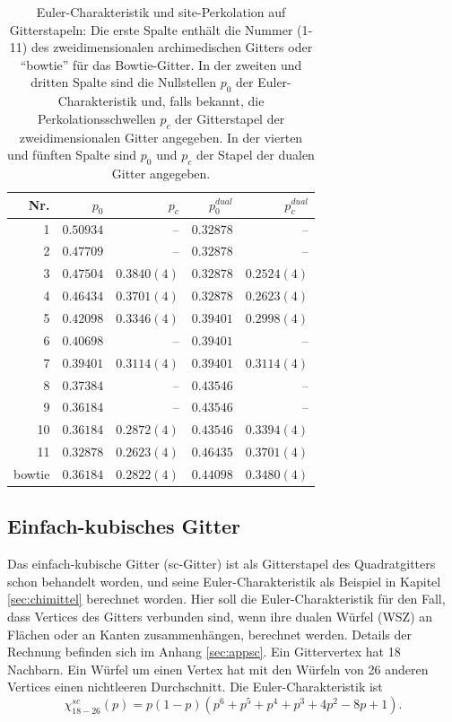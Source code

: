 \begin{table}
  \centering
  \begin{tabular} {|r|r|r||r|r|}
\hline
Nr. & $p_0$ & $p_c$\cite{Marck:97} & $p_0^{dual}$ &$ p_c^{dual}$\cite{Marck:97} \\ \hline
1 &$0.50934$&--&$0.32878$&--\\ \hline
2 &$0.47709$&--&$0.32878$&--\\ \hline
3 &$0.47504$&$0.3840(4)$&$0.32878$&$0.2524(4)$ \\ \hline
4 &$0.46434$&$0.3701(4)$&$0.32878$&$0.2623(4)$ \\ \hline
5 &$0.42098 $&$0.3346(4)$&$0.39401$&$0.2998(4)$ \\ \hline
6 &$0.40698$&--& $0.39401$&--\\ \hline
7 &$0.39401 $&$0.3114(4)$&$0.39401$&$0.3114(4)$ \\ \hline
8 &$0.37384$&--& $0.43546$&--\\ \hline
9 &$0.36184$&--&  $0.43546$&--\\ \hline
10 &$0.36184 $&$0.2872(4)$& $0.43546$&$0.3394(4)$ \\ \hline
11 &$0.32878 $&$0.2623(4)$&$0.46435$&$0.3701(4)$ \\ \hline
bowtie &$0.36184$&$ 0.2822(4)$ &$0.44098$ &$0.3480(4)$ \\ \hline
\end{tabular}
\caption{Euler-Charakteristik und site-Perkolation auf Gitterstapeln: Die erste Spalte enth\"alt die Nummer (1-11) des zweidimensionalen archimedischen Gitters oder ``bowtie'' f\"ur das Bowtie-Gitter. In der zweiten und dritten Spalte sind die Nullstellen $p_0$ der Euler-Charakteristik und, falls bekannt, die Perkolationsschwellen $p_c$ der Gitterstapel der zweidimensionalen Gitter angegeben. In der vierten und f\"unften Spalte sind $p_0$ und $p_c$ der Stapel der dualen Gitter angegeben. }
\label{tab:stacked}
\end{table}

\subsection{Einfach-kubisches Gitter}
Das einfach-kubische Gitter (sc-Gitter) ist als Gitterstapel des Quadratgitters schon behandelt worden, und seine Euler-Charakteristik als Beispiel in Kapitel \ref{sec:chimittel} berechnet worden. Hier soll die Euler-Charakteristik f\"ur den Fall, dass Vertices des Gitters verbunden sind, wenn ihre dualen W\"urfel (WSZ) an Fl\"achen oder an Kanten zusammenh\"angen, berechnet werden. Details der Rechnung befinden sich im Anhang \ref{sec:appsc}. Ein Gittervertex hat 18 Nachbarn. Ein W\"urfel um einen Vertex hat mit den W\"urfeln von 26 anderen Vertices einen nichtleeren Durchschnitt. Die Euler-Charakteristik ist
 \begin{equation}
  \chi_{18-26}^{sc}(p)=p(1-p)(p^6+p^5+p^4+p^3+4p^2-8p+1).
\end{equation}

